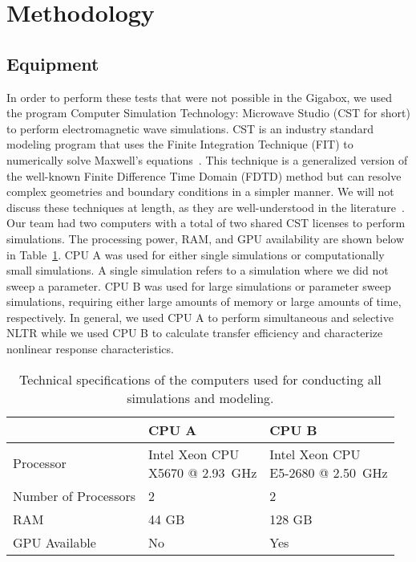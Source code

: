 \section{Methodology}
\label{sec:numerical-meth}

\subsection{Equipment}
In order to perform these tests that were not possible in the Gigabox, we used the program Computer Simulation Technology: Microwave Studio (CST for short) to perform electromagnetic wave simulations. CST is an industry standard modeling program that uses the Finite Integration Technique (FIT) to numerically solve Maxwell's equations~\cite{computersimulationtechnology}. This technique is a generalized version of the well-known Finite Difference Time Domain (FDTD) method but can resolve complex geometries and boundary conditions in a simpler manner. We will not discuss these techniques at length, as they are well-understood in the literature~\cite{schneider2010understanding,weiland2001discrete}.
Our team had two computers with a total of two shared CST licenses to perform simulations. The processing power, RAM, and GPU availability are shown below in Table~\ref{tab:numerical-cpu-specs}. CPU A was used for either single simulations or computationally small simulations. A single simulation refers to a simulation where we did not sweep a parameter.  CPU B was used for large simulations or parameter sweep simulations, requiring either large amounts of memory or large amounts of time, respectively. In general, we used CPU A to perform simultaneous and selective NLTR while we used CPU B to calculate transfer efficiency and characterize nonlinear response characteristics.

\def\arraystretch{2}
\begin{table}[h]
\centering
\begin{tabular}{|l|l|l|}
\hline
 & \textbf{CPU A} & \textbf{CPU B} \\ \hline
Processor & \rule{0pt}{2.5em}\shortstack{Intel Xeon CPU \\ X5670 @ 2.93~GHz} & \rule{0pt}{2.5em}\shortstack{Intel Xeon CPU \\ E5-2680 @ 2.50~GHz} \\ \hline
Number of Processors & 2 & 2 \\ \hline
RAM & 44 GB & 128 GB \\ \hline
GPU Available & No & Yes \\ \hline
\end{tabular}
\caption[Computer specifications]{Technical specifications of the computers used for conducting all simulations and modeling.}
\label{tab:numerical-cpu-specs}
\end{table}

